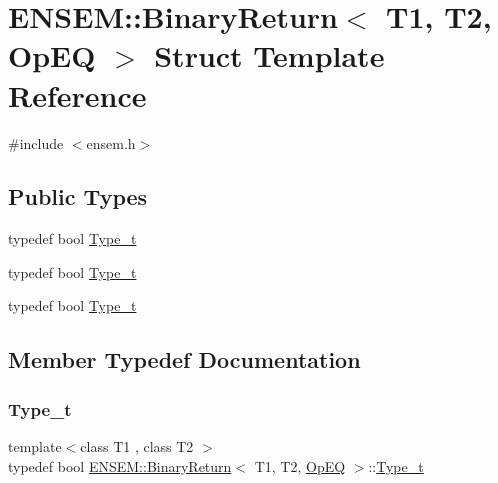 \hypertarget{structENSEM_1_1BinaryReturn_3_01T1_00_01T2_00_01OpEQ_01_4}{}\section{E\+N\+S\+EM\+:\+:Binary\+Return$<$ T1, T2, Op\+EQ $>$ Struct Template Reference}
\label{structENSEM_1_1BinaryReturn_3_01T1_00_01T2_00_01OpEQ_01_4}


{\ttfamily \#include $<$ensem.\+h$>$}

\subsection*{Public Types}
\begin{DoxyCompactItemize}
\item 
typedef bool \mbox{\hyperlink{structENSEM_1_1BinaryReturn_3_01T1_00_01T2_00_01OpEQ_01_4_a78e18e010c85e91abd8944d6f76af63d}{Type\+\_\+t}}
\item 
typedef bool \mbox{\hyperlink{structENSEM_1_1BinaryReturn_3_01T1_00_01T2_00_01OpEQ_01_4_a78e18e010c85e91abd8944d6f76af63d}{Type\+\_\+t}}
\item 
typedef bool \mbox{\hyperlink{structENSEM_1_1BinaryReturn_3_01T1_00_01T2_00_01OpEQ_01_4_a78e18e010c85e91abd8944d6f76af63d}{Type\+\_\+t}}
\end{DoxyCompactItemize}


\subsection{Member Typedef Documentation}
\mbox{\label{structENSEM_1_1BinaryReturn_3_01T1_00_01T2_00_01OpEQ_01_4_a78e18e010c85e91abd8944d6f76af63d}} 
\subsubsection{\texorpdfstring{Type\_t}{Type\_t}\hspace{0.1cm}{\footnotesize\ttfamily [1/3]}}
{\footnotesize\ttfamily template$<$class T1 , class T2 $>$ \\
typedef bool \mbox{\hyperlink{structENSEM_1_1BinaryReturn}{E\+N\+S\+E\+M\+::\+Binary\+Return}}$<$ T1, T2, \mbox{\hyperlink{structENSEM_1_1OpEQ}{Op\+EQ}} $>$\+::\mbox{\hyperlink{structENSEM_1_1BinaryReturn_3_01T1_00_01T2_00_01OpEQ_01_4_a78e18e010c85e91abd8944d6f76af63d}{Type\+\_\+t}}}

